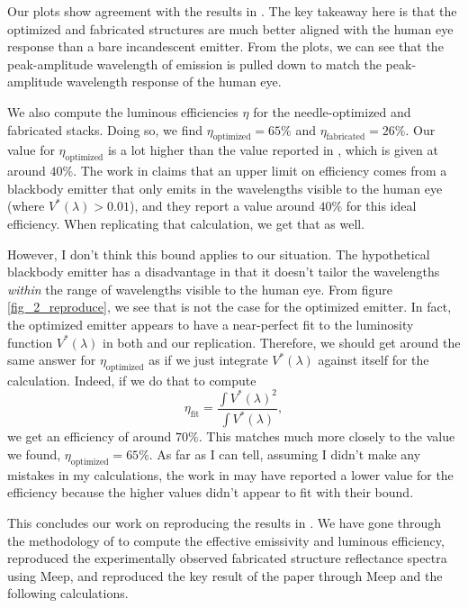 \documentclass[%
 reprint,
 amsmath,amssymb,
 aps
]{revtex4-2}
\begin{document}
Our plots show agreement with the results in \cite{ilic}. The key takeaway here is that the optimized and fabricated structures are much better aligned with the human eye response than a bare incandescent emitter. From the plots, we can see that the peak-amplitude wavelength of emission is pulled down to match the peak-amplitude wavelength response of the human eye. 

We also compute the luminous efficiencies $\eta$ for the needle-optimized and fabricated stacks. Doing so, we find $\eta_{\text{optimized}} = 65\%$ and $\eta_{\text{fabricated}} = 26\%$. Our value for $\eta_{\text{optimized}}$ is a lot higher than the value reported in \cite{ilic}, which is given at around $40\%$. The work in \cite{ilic} claims that an upper limit on efficiency comes from a blackbody emitter that only emits in the wavelengths visible to the human eye (where $V^*(\lambda) > 0.01$), and they report a value around $40\%$ for this ideal efficiency. When replicating that calculation, we get that as well. 

However, I don't think this bound applies to our situation. The hypothetical blackbody emitter has a disadvantage in that it doesn't tailor the wavelengths {\it within} the range of wavelengths visible to the human eye. From figure \ref{fig_2_reproduce}, we see that is not the case for the optimized emitter. In fact, the optimized emitter appears to have a near-perfect fit to the luminosity function $V^*(\lambda)$ in both \cite{ilic} and our replication. Therefore, we should get around the same answer for $\eta_{\text{optimized}}$ as if we just integrate $V^*(\lambda)$ against itself for the calculation. Indeed, if we do that to compute \begin{equation}\eta_{\text{fit}} = \frac{\int V^*(\lambda)^2}{\int V^*(\lambda)},\end{equation} we get an efficiency of around $70\%$. This matches much more closely to the value we found, $\eta_{\text{optimized}} = 65\%$. As far as I can tell, assuming I didn't make any mistakes in my calculations, the work in \cite{ilic} may have reported a lower value for the efficiency because the higher values didn't appear to fit with their bound.

This concludes our work on reproducing the results in \cite{ilic}. We have gone through the methodology of \cite{ilic} to compute the effective emissivity and luminous efficiency, reproduced the experimentally observed fabricated structure reflectance spectra using Meep, and reproduced the key result of the paper through Meep and the following calculations.
\end{document}
